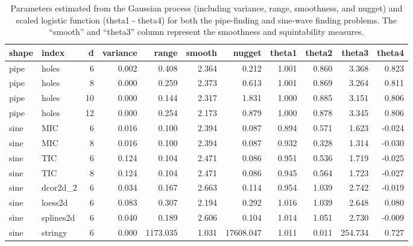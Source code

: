 \documentclass[
  number,
  preprint,
  3p]{elsarticle}
\begin{document}
\begin{longtable}[t]{|>{}ll>{}r|rrr>{}r|rrr>{}r|}

\caption{\label{tbl-smoothness-squintability}Parameters estimated from
the Gaussian process (including variance, range, smoothness, and nugget)
and scaled logistic function (theta1 - theta4) for both the pipe-finding
and sine-wave finding problems. The ``smooth'' and ``theta3'' column
represent the smoothness and squintability measures.}

\tabularnewline

\toprule
shape & index & d & variance & range & smooth & nugget & theta1 & theta2 & theta3 & theta4\\
\midrule
pipe & holes & 6 & 0.002 & 0.408 & 2.364 & 0.212 & 1.001 & 0.860 & 3.368 & 0.823\\
pipe & holes & 8 & 0.000 & 0.259 & 2.373 & 0.613 & 1.001 & 0.869 & 3.264 & 0.811\\
pipe & holes & 10 & 0.000 & 0.144 & 2.317 & 1.831 & 1.000 & 0.885 & 3.151 & 0.806\\
pipe & holes & 12 & 0.000 & 0.254 & 2.173 & 0.879 & 1.000 & 0.878 & 3.345 & 0.806\\
sine & MIC & 6 & 0.016 & 0.100 & 2.394 & 0.087 & 0.894 & 0.571 & 1.623 & -0.024\\
\addlinespace
sine & MIC & 8 & 0.016 & 0.100 & 2.394 & 0.087 & 0.932 & 0.328 & 1.314 & -0.030\\
sine & TIC & 6 & 0.124 & 0.104 & 2.471 & 0.086 & 0.951 & 0.536 & 1.719 & -0.025\\
sine & TIC & 8 & 0.124 & 0.104 & 2.471 & 0.086 & 0.945 & 0.564 & 1.723 & -0.027\\
sine & dcor2d\_2 & 6 & 0.034 & 0.167 & 2.663 & 0.114 & 0.954 & 1.039 & 2.742 & -0.019\\
sine & loess2d & 6 & 0.083 & 0.307 & 2.194 & 0.292 & 1.016 & 1.039 & 2.648 & 0.080\\
\addlinespace
sine & splines2d & 6 & 0.040 & 0.189 & 2.606 & 0.104 & 1.014 & 1.051 & 2.730 & -0.009\\
sine & stringy & 6 & 0.000 & 1173.035 & 1.031 & 17608.047 & 1.011 & 0.011 & 254.734 & 0.727\\
\bottomrule

\end{longtable}
\end{document}
